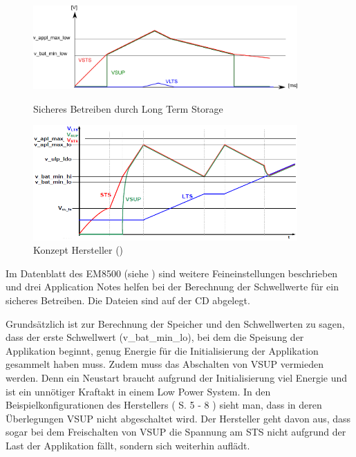 \begin{figure}[ht]
 \begin{minipage}[t]{0.5\textwidth}
   \includegraphics[width=0.9\textwidth]{2TheoretischeGrundlagen/imag/levelMitLTS.png}
   \caption{Sicheres Betreiben durch Long Term Storage}
   \label{energiespeisung_lts} 
 \end{minipage}
 \begin{minipage}[t]{0.5\textwidth}
   \includegraphics[width=0.9\textwidth]{2TheoretischeGrundlagen/imag/KonzeptFirma.png}
   \caption{Konzept Hersteller (\cite{datasheet_EM85})}
   \label{konzept_levels_em} 
 \end{minipage}
\end{figure}

Im Datenblatt des EM8500 (siehe \cite{datasheet_EM85}) sind weitere Feineinstellungen beschrieben und drei Application Notes helfen bei der Berechnung der Schwellwerte für ein sicheres Betreiben. Die Dateien sind auf der CD abgelegt.

Grundsätzlich ist zur Berechnung der Speicher und den Schwellwerten zu sagen, dass der erste Schwellwert (v\_bat\_min\_lo), bei dem die Speisung der Applikation beginnt, genug Energie für die Initialisierung der Applikation gesammelt haben muss. Zudem muss das Abschalten von VSUP vermieden werden. Denn ein Neustart braucht aufgrund der Initialisierung viel Energie und ist ein unnötiger Kraftakt in einem Low Power System. In den Beispielkonfigurationen des Herstellers (\cite{datasheet_EM85} S. 5 - 8 ) sieht man, dass in deren Überlegungen VSUP nicht abgeschaltet wird. Der Hersteller geht davon aus, dass sogar bei dem Freischalten von VSUP die Spannung am STS nicht aufgrund der Last der Applikation fällt, sondern sich weiterhin auflädt.

